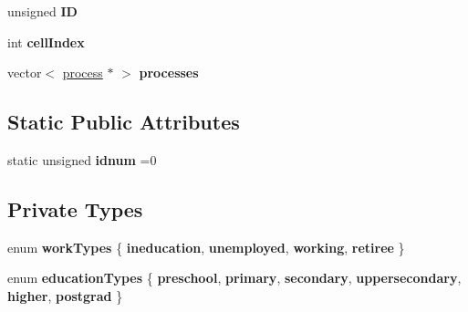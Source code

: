 \begin{DoxyCompactItemize}
\mbox{\label{classagent_a7f99e11ffb5c042be84e2917cba7af3a}} 
unsigned {\bfseries ID}
\item 
\mbox{\label{classagent_a3db995cae037474ae4bf7adcb7cd44cc}} 
int {\bfseries cell\+Index}
\item 
\mbox{\label{classagent_a13305f6e66e992cf1c6ffa7b027c4201}} 
vector$<$ \mbox{\hyperlink{classprocess}{process}} $\ast$ $>$ {\bfseries processes}
\end{DoxyCompactItemize}
\subsection*{Static Public Attributes}
\begin{DoxyCompactItemize}
\item 
\mbox{\label{classagent_a4fd7d01331ffd547ae9fc8eb9b05516d}} 
static unsigned {\bfseries idnum} =0
\end{DoxyCompactItemize}
\subsection*{Private Types}
\begin{DoxyCompactItemize}
\item 
\mbox{\label{classagent_a56ecbbe6f1ec07d60ed3c30988810e22}} 
enum {\bfseries work\+Types} \{ {\bfseries ineducation}, 
{\bfseries unemployed}, 
{\bfseries working}, 
{\bfseries retiree}
 \}
\item 
\mbox{\label{classagent_a499a1e074636f81ed46fe569107e6cde}} 
enum {\bfseries education\+Types} \{ \newline
{\bfseries preschool}, 
{\bfseries primary}, 
{\bfseries secondary}, 
{\bfseries uppersecondary}, 
\newline
{\bfseries higher}, 
{\bfseries postgrad}
 \}
\end{DoxyCompactItemize}

